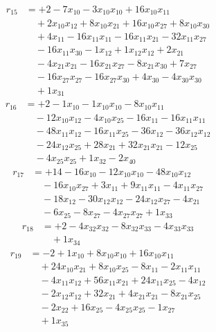 \[\begin{aligned}
r_{15} &= + 2 - 7 x_{10} - 3 x_{10} x_{10} + 16 x_{10} x_{11} \\
 &\quad + 2 x_{10} x_{12} + 8 x_{10} x_{21} + 16 x_{10} x_{27} + 8 x_{10} x_{30} \\
 &\quad + 4 x_{11} - 16 x_{11} x_{11} - 16 x_{11} x_{21} - 32 x_{11} x_{27} \\
 &\quad - 16 x_{11} x_{30} - 1 x_{12} + 1 x_{12} x_{12} + 2 x_{21} \\
 &\quad - 4 x_{21} x_{21} - 16 x_{21} x_{27} - 8 x_{21} x_{30} + 7 x_{27} \\
 &\quad - 16 x_{27} x_{27} - 16 x_{27} x_{30} + 4 x_{30} - 4 x_{30} x_{30} \\
 &\quad + 1 x_{31}
\end{aligned}\]
\[\begin{aligned}
r_{16} &= + 2 - 1 x_{10} - 1 x_{10} x_{10} - 8 x_{10} x_{11} \\
 &\quad - 12 x_{10} x_{12} - 4 x_{10} x_{25} - 16 x_{11} - 16 x_{11} x_{11} \\
 &\quad - 48 x_{11} x_{12} - 16 x_{11} x_{25} - 36 x_{12} - 36 x_{12} x_{12} \\
 &\quad - 24 x_{12} x_{25} + 28 x_{21} + 32 x_{21} x_{21} - 12 x_{25} \\
 &\quad - 4 x_{25} x_{25} + 1 x_{32} - 2 x_{40}
\end{aligned}\]
\[\begin{aligned}
r_{17} &= + 14 - 16 x_{10} - 12 x_{10} x_{10} - 48 x_{10} x_{12} \\
 &\quad - 16 x_{10} x_{27} + 3 x_{11} + 9 x_{11} x_{11} - 4 x_{11} x_{27} \\
 &\quad - 18 x_{12} - 30 x_{12} x_{12} - 24 x_{12} x_{27} - 4 x_{21} \\
 &\quad - 6 x_{25} - 8 x_{27} - 4 x_{27} x_{27} + 1 x_{33}
\end{aligned}\]
\[\begin{aligned}
r_{18} &= + 2 - 4 x_{32} x_{32} - 8 x_{32} x_{33} - 4 x_{33} x_{33} \\
 &\quad + 1 x_{34}
\end{aligned}\]
\[\begin{aligned}
r_{19} &= - 2 + 1 x_{10} + 8 x_{10} x_{10} + 16 x_{10} x_{11} \\
 &\quad + 24 x_{10} x_{21} + 8 x_{10} x_{25} - 8 x_{11} - 2 x_{11} x_{11} \\
 &\quad - 4 x_{11} x_{12} + 56 x_{11} x_{21} + 24 x_{11} x_{25} - 4 x_{12} \\
 &\quad - 2 x_{12} x_{12} + 32 x_{21} + 4 x_{21} x_{21} - 8 x_{21} x_{25} \\
 &\quad - 2 x_{22} + 16 x_{25} - 4 x_{25} x_{25} - 1 x_{27} \\
 &\quad + 1 x_{35}
\end{aligned}\]
